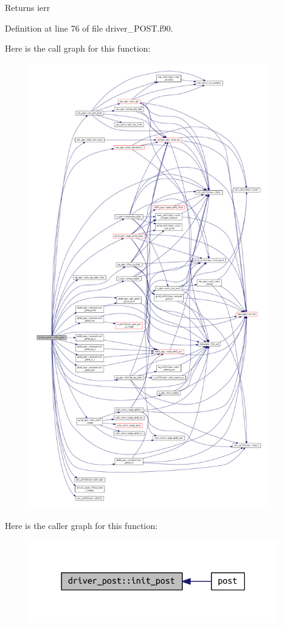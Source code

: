 \begin{DoxyReturn}{Returns}
ierr 
\end{DoxyReturn}


Definition at line 76 of file driver\+\_\+\+P\+O\+S\+T.\+f90.

Here is the call graph for this function\+:\nopagebreak
\begin{figure}[H]
\begin{center}
\leavevmode
\includegraphics[height=550pt]{namespacedriver__post_af527706d4e696d4e507443d2f74194ef_cgraph}
\end{center}
\end{figure}
Here is the caller graph for this function\+:\nopagebreak
\begin{figure}[H]
\begin{center}
\leavevmode
\includegraphics[width=306pt]{namespacedriver__post_af527706d4e696d4e507443d2f74194ef_icgraph}
\end{center}
\end{figure}
